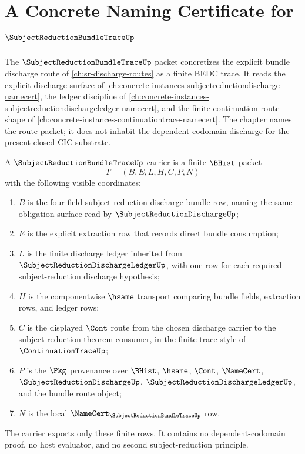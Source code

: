 \chapter{A Concrete Naming Certificate for $\SubjectReductionBundleTraceUp$}
\label{ch:concrete-instances-subject-reduction-bundle-trace-namecert}

The $\SubjectReductionBundleTraceUp$ packet concretizes the explicit bundle
discharge route of \autoref{ch:sr-discharge-routes} as a finite BEDC trace. It
reads the explicit discharge surface of
\autoref{ch:concrete-instances-subjectreductiondischarge-namecert}, the ledger
discipline of
\autoref{ch:concrete-instances-subjectreductiondischargeledger-namecert}, and
the finite continuation route shape of
\autoref{ch:concrete-instances-continuationtrace-namecert}. The chapter names
the route packet; it does not inhabit the dependent-codomain discharge for the
present closed-CIC substrate.

\begin{definition}
\label{def:subject-reduction-bundle-trace-carrier}
A $\SubjectReductionBundleTraceUp$ carrier is a finite $\BHist$ packet
$$
T=(B,E,L,H,C,P,N)
$$
with the following visible coordinates:
\begin{enumerate}
\item $B$ is the four-field subject-reduction discharge bundle row, naming the same obligation surface read by $\SubjectReductionDischargeUp$;
\item $E$ is the explicit extraction row that records direct bundle consumption;
\item $L$ is the finite discharge ledger inherited from $\SubjectReductionDischargeLedgerUp$, with one row for each required subject-reduction discharge hypothesis;
\item $H$ is the componentwise $\hsame$ transport comparing bundle fields, extraction rows, and ledger rows;
\item $C$ is the displayed $\Cont$ route from the chosen discharge carrier to the subject-reduction theorem consumer, in the finite trace style of $\ContinuationTraceUp$;
\item $P$ is the $\Pkg$ provenance over $\BHist$, $\hsame$, $\Cont$, $\NameCert$, $\SubjectReductionDischargeUp$, $\SubjectReductionDischargeLedgerUp$, and the bundle route object;
\item $N$ is the local $\NameCert_{\SubjectReductionBundleTraceUp}$ row.
\end{enumerate}
The carrier exports only these finite rows. It contains no dependent-codomain
proof, no host evaluator, and no second subject-reduction principle.
\end{definition}


